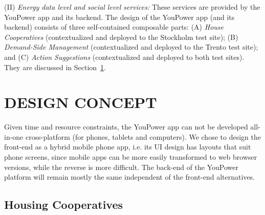 (II) \textit{Energy data level and social level services:} These services are provided by the YouPower app and its backend. The design of the YouPower app (and its backend) consists of three self-contained composable parts: (A) \textit{House Cooperatives} (contextualized and deployed to the Stockholm test site); (B) \textit{Demand-Side Management} (contextualized and deployed
to the Trento test site); and (C) \textit{Action Suggestions} (contextualized and deployed to both test sites). They are discussed in Section~\ref{sect:design_concept}.

\section{\uppercase{Design Concept}}
\label{sect:design_concept}

Given time and resource constraints, the YouPower app can not be developed all-in-one cross-platform (for phones, tablets and computers). We chose to design the front-end as a hybrid mobile phone app, i.e. its UI design has layouts that suit phone screens, %
since mobile apps can be more easily transformed to web browser versions, while the reverse is more difficult. The back-end of the YouPower platform will remain mostly the same independent of the front-end alternatives. 

\subsection{Housing Cooperatives}
\label{sect:brf}

